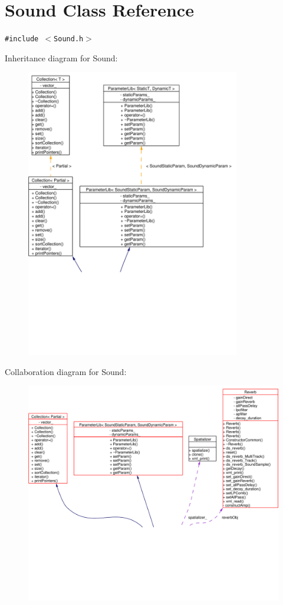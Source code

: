 \hypertarget{classSound}{
\section{Sound Class Reference}
\label{classSound}
}
{\tt \#include $<$Sound.h$>$}

Inheritance diagram for Sound:\begin{figure}[H]
\begin{center}
\leavevmode
\includegraphics[width=265pt]{classSound__inherit__graph}
\end{center}
\end{figure}
Collaboration diagram for Sound:\begin{figure}[H]
\begin{center}
\leavevmode
\includegraphics[width=354pt]{classSound__coll__graph}
\end{center}
\end{figure}
